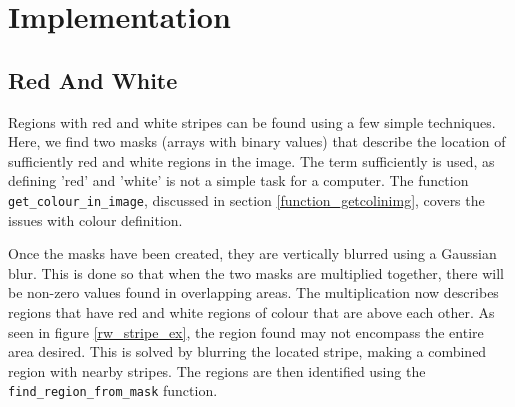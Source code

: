 \documentclass[../main.tex]{subfiles}
\begin{document}
  \section{Implementation}
    \subsection{Red And White}
      Regions with red and white stripes can be found using a few simple techniques.
      Here, we find two masks (arrays with binary values) that describe the location of sufficiently red and white regions in the image.
      The term sufficiently is used, as defining 'red' and 'white' is not a simple task for a computer.
      The function \texttt{get\_colour\_in\_image}, discussed in section \ref{function_getcolinimg}, covers the issues with colour definition.

      Once the masks have been created, they are vertically blurred using a Gaussian blur.
      This is done so that when the two masks are multiplied together, there will be non-zero values found in overlapping areas.
      The multiplication now describes regions that have red and white regions of colour that are above each other.
      As seen in figure \ref{rw_stripe_ex}, the region found may not encompass the entire area desired.
      This is solved by blurring the located stripe, making a combined region with nearby stripes.
      The regions are then identified using the \texttt{find\_region\_from\_mask} function.
    
    
    
    
    

\biblio
\end{document}
